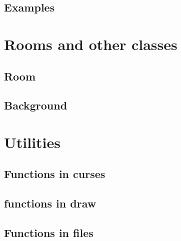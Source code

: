 	\section{Examples}

\chapter{Rooms and other classes}
	\section{Room}
	
	
	\section{Background}
	
	
\chapter{Utilities}
	\section{Functions in curses}
	
	
	\section{functions in draw}
	
	
	\section{Functions in files}
	
	
	

